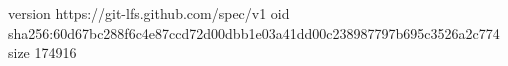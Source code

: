 version https://git-lfs.github.com/spec/v1
oid sha256:60d67bc288f6c4e87ccd72d00dbb1e03a41dd00c238987797b695c3526a2c774
size 174916
